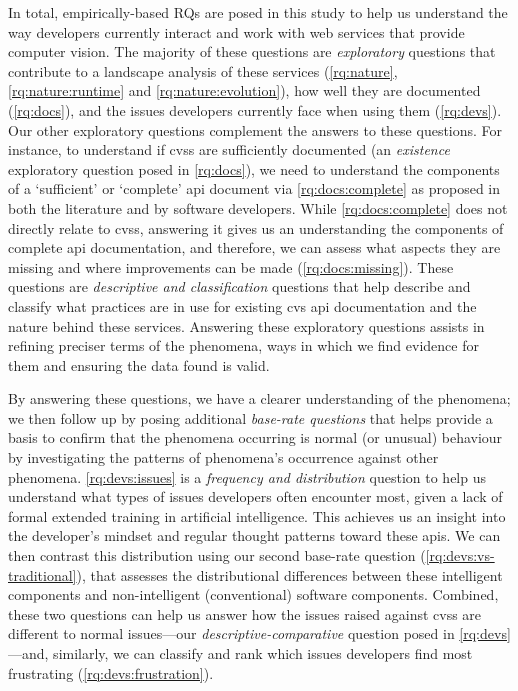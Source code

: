 In total, \NumEmpiricalRQs{} empirically-based RQs are posed in this study to help us understand the way developers currently interact and work with web services that provide computer vision. The majority of these questions are \textit{exploratory} questions that contribute to a landscape analysis of these services (\ref{rq:nature}, \ref{rq:nature:runtime} and \ref{rq:nature:evolution}), how well they are documented (\ref{rq:docs}), and the issues developers currently face when using them (\ref{rq:devs}). Our other exploratory questions complement the answers to these questions. For instance, to understand if \glspl{cvs} are sufficiently documented (an \textit{existence} exploratory question posed in \ref{rq:docs}), we need to understand the components of a `sufficient' or `complete' \gls{api} document via \ref{rq:docs:complete} as proposed in both the literature and by software developers. While \ref{rq:docs:complete} does not directly relate to \glspl{cvs}, answering it gives us an understanding the components of complete \gls{api} documentation, and therefore, we can assess what aspects they are missing and where improvements can be made (\ref{rq:docs:missing}). These questions are \textit{descriptive and classification} questions that help describe and classify what practices are in use for existing \gls{cvs} \gls{api} documentation and the nature behind these services. Answering these exploratory questions assists in refining preciser terms of the phenomena, ways in which we find evidence for them and ensuring the data found is valid.

By answering these questions, we have a clearer understanding of the phenomena; we then follow up by posing \NumBaseRateRQs{} additional \textit{base-rate questions} that helps provide a basis to confirm that the phenomena occurring is normal (or unusual) behaviour by investigating the patterns of phenomena's occurrence against other phenomena. \ref{rq:devs:issues} is a \textit{frequency and distribution} question to help us understand what types of issues developers often encounter most, given a lack of formal extended training in artificial intelligence. This achieves us an insight into the developer's mindset and regular thought patterns toward these \glspl{api}. We can then contrast this distribution using our second base-rate question (\ref{rq:devs:vs-traditional}), that assesses the distributional differences between these intelligent components and non-intelligent (conventional) software components. Combined, these two questions can help us answer how the issues raised against \glspl{cvs} are different to normal  issues---our \textit{descriptive-comparative} question posed in \ref{rq:devs}---and, similarly, we can classify and rank which issues developers find most frustrating (\ref{rq:devs:frustration}).

